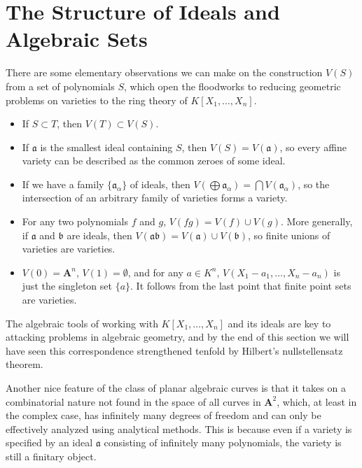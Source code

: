 \section{The Structure of Ideals and Algebraic Sets}

There are some elementary observations we can make on the construction $V(S)$ from a set of polynomials $S$, which open the floodworks to reducing geometric problems on varieties to the ring theory of $K[X_1, \dots, X_n]$.
%
\begin{itemize}
    \item If $S \subset T$, then $V(T) \subset V(S)$.

    \item If $\mathfrak{a}$ is the smallest ideal containing $S$, then $V(S) = V(\mathfrak{a})$, so every affine variety can be described as the common zeroes of some ideal.

    \item If we have a family $\{ \mathfrak{a}_\alpha \}$ of ideals, then $V(\bigoplus \mathfrak{a}_\alpha) = \bigcap V(\mathfrak{a}_\alpha)$, so the intersection of an arbitrary family of varieties forms a variety.

    \item For any two polynomials $f$ and $g$, $V(fg) = V(f) \cup V(g)$. More generally, if $\mathfrak{a}$ and $\mathfrak{b}$ are ideals, then $V(\mathfrak{a}\mathfrak{b}) = V(\mathfrak{a}) \cup V(\mathfrak{b})$, so finite unions of varieties are varieties.

    \item $V(0) = \mathbf{A}^n$, $V(1) = \emptyset$, and for any $a \in K^n$, $V(X_1-a_1,\dots,X_n - a_n)$ is just the singleton set $\{ a \}$. It follows from the last point that finite point sets are varieties.
\end{itemize}
%
The algebraic tools of working with $K[X_1, \dots, X_n]$ and its ideals are key to attacking problems in algebraic geometry, and by the end of this section we will have seen this correspondence strengthened tenfold by Hilbert's nullstellensatz theorem.

Another nice feature of the class of planar algebraic curves is that it takes on a combinatorial nature not found in the space of all curves in $\mathbf{A}^2$, which, at least in the complex case, has infinitely many degrees of freedom and can only be effectively analyzed using analytical methods. This is because even if a variety is specified by an ideal $\mathfrak{a}$ consisting of infinitely many polynomials, the variety is still a finitary object.

